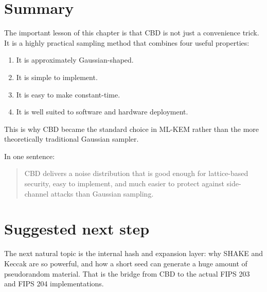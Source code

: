 \section{Summary}

The important lesson of this chapter is that CBD is not just a convenience trick.
It is a highly practical sampling method that combines four useful properties:

\begin{enumerate}
  \item It is approximately Gaussian-shaped.
  \item It is simple to implement.
  \item It is easy to make constant-time.
  \item It is well suited to software and hardware deployment.
\end{enumerate}

This is why CBD became the standard choice in ML-KEM rather than the more theoretically traditional Gaussian sampler.

In one sentence:

\begin{quote}
CBD delivers a noise distribution that is good enough for lattice-based security, easy to implement, and much easier to protect against side-channel attacks than Gaussian sampling.
\end{quote}

\section{Suggested next step}

The next natural topic is the internal hash and expansion layer: why SHAKE and Keccak are so powerful, and how a short seed can generate a huge amount of pseudorandom material. That is the bridge from CBD to the actual FIPS 203 and FIPS 204 implementations.

\printbibliography[heading=chapterrefs]
